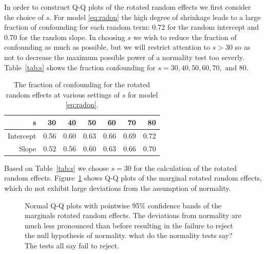 \documentclass[12pt]{article} %
\newcommand{\hh}[1]{{\color{orange} #1}}
\newcommand{\al}[1]{{\color{red} #1}}
\begin{document}
In order to construct Q-Q plots of the rotated random effects we first consider the choice of $s$. For model \eqref{eq:radon} the high degree of shrinkage leads to a large fraction of confounding for each random term: 0.72 for the random intercept and 0.70 for the random slope. In choosing $s$ we wish to reduce the fraction of confounding \al{as much as possible}, but we will restrict attention to $s > 30$ so as not to decrease the maximum possible power of a normality test too severly. Table~\eqref{tab:s} shows the fraction confounding for $s = 30, 40, 50, 60, 70, \text{ and } 80$. 
%
\begin{table}[ht]
\centering
\caption{\label{tab:s} The fraction of confounding for the rotated random effects at various settings of $s$ for model \eqref{eq:radon}.}
\begin{tabular}{rrrrrrr}
  \hline
  s         & 30 & 40 & 50 & 60 & 70 & 80 \\ \hline
  Intercept & 0.56 & 0.60 & 0.63 & 0.66 & 0.69 & 0.72 \\ 
  Slope     & 0.52 & 0.56 & 0.60 & 0.63 & 0.66 & 0.70 \\ 
   \hline
\end{tabular}
\end{table}
%
Based on  Table~\eqref{tab:s} we choose $s=30$ for the calculation of the rotated random effects. Figure~\ref{fig:rotate-radon} shows Q-Q plots of the marginal rotated random effects, which do not exhibit large deviations from the assumption of normality.



\begin{figure}[htb]
	\centering
	\caption{\label{fig:rotate-radon} Normal Q-Q plots with pointwise 95\% confidence bands of the marginals rotated random effects. The deviations from normality are much less pronounced than before resulting in the failure to reject the null hypothesis of normality. \hh{what do the normality tests say?} \al{The tests all say fail to reject.}}
\end{figure}
\end{document}
